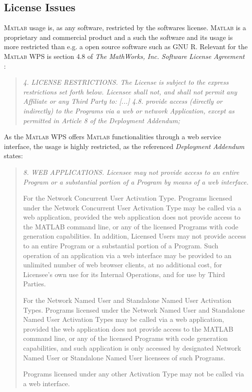 	\subsection{License Issues}
		\textsc{Matlab} usage is, as any software, restricted by the softwares license. \textsc{Matlab} is a proprietary and commercial product and a such the software and its usage is more restricted than e.g. a open source software such as GNU R. Relevant for the \textsc{Matlab} WPS is section 4.8 of \emph{The MathWorks, Inc. Software License Agreement} \citep{matlablicense}:
		\begin{quote}\itshape
			4. LICENSE RESTRICTIONS.  The License is subject to the express restrictions
			set forth below. Licensee shall not, and shall not permit any Affiliate or any
			Third Party to:
				[...]
				4.8. provide access (directly or indirectly) to the Programs via a web or
				network Application, except as permitted in Article 8 of the Deployment
				Addendum;
		\end{quote}

		As the \textsc{Matlab} WPS offers \textsc{Matlab} functionalities through a web service interface, the usage is highly restricted, as the referenced \emph{Deployment Addendum} \citep{matlablicense} states:

		\begin{quote}\itshape
			8. WEB APPLICATIONS.  Licensee may not provide access to an entire Program
			or a substantial portion of a Program by means of a web interface.

			For the Network Concurrent User Activation Type.  Programs licensed under the
			Network Concurrent User Activation Type may be called via a web application,
			provided the web application does not provide access to the MATLAB command
			line, or any of the licensed Programs with code generation capabilities.  In
			addition, Licensed Users may not provide access to an entire Program or a
			substantial portion of a Program.  Such operation of an application via a web
			interface may be provided to an unlimited number of web browser clients, at no
			additional cost, for Licensee's own use for its Internal Operations, and for
			use by Third Parties.

			For the Network Named User and Standalone Named User Activation Types.
			Programs licensed under the Network Named User and Standalone Named User
			Activation Types may be called via a web application, provided the web
			application does not provide access to the MATLAB command line, or any of the
			licensed Programs with code generation capabilities, and such application is
			only accessed by designated Network Named User or Standalone Named User
			licensees of such Programs.

			Programs licensed under any other Activation Type may not be called via a web
			interface.
		\end{quote}

